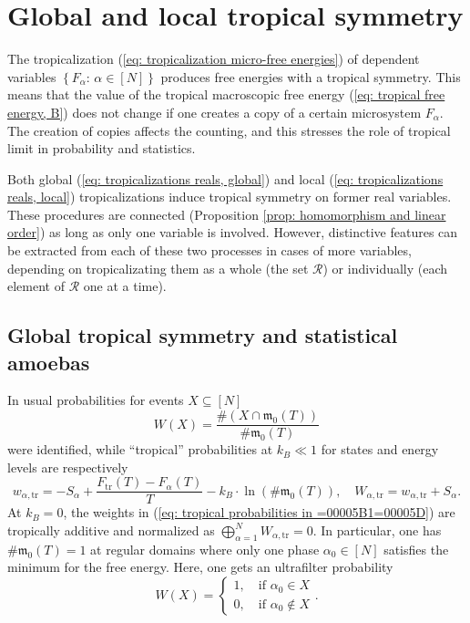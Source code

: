 \documentclass[11pt,british,reqno]{article}
\numberwithin{equation}{section}
\numberwithin{figure}{section}
\numberwithin{table}{section}
\theoremstyle{definition}
\theoremstyle{definition}
\theoremstyle{plain}
\theoremstyle{plain}
\theoremstyle{remark}
\theoremstyle{plain}
\numberwithin{equation}{section}
\numberwithin{figure}{section}
\numberwithin{table}{section}
\theoremstyle{plain}
\begin{document}
\section{\label{sec: Global and local tropical symmetry}
Global and local tropical symmetry}

The tropicalization (\ref{eq: tropicalization micro-free energies})
of dependent variables $\left\{ F_{\alpha}:\,\alpha\in[N]\right\} $
produces free energies with a tropical symmetry. This means that the
value of the tropical macroscopic free energy (\ref{eq: tropical free energy, B})
does not change if one creates a copy of a certain microsystem $F_{\alpha}$.
The creation of copies affects the counting, and this stresses the role of tropical limit in probability and statistics. 

Both global (\ref{eq: tropicalizations reals, global}) and local
(\ref{eq: tropicalizations reals, local}) tropicalizations induce
tropical symmetry on former real variables. These procedures are connected (Proposition \ref{prop: homomorphism and linear order}) as long as only one variable is involved. However, distinctive features can be extracted from each of these two processes in cases of more variables, depending on tropicalizating them as a whole (the set $\mathcal{R}$) or individually (each element of $\mathcal{R}$ one at a time).  

\subsection{\label{subsec: Global tropical symmetry and statistical amoebas}
Global tropical symmetry and statistical amoebas}

In \cite{AK2015} usual probabilities for events $X\subseteq[N]$
\begin{equation}
W(X)=\frac{\#\left(X\cap\mathfrak{m}_{0}(T)\right)}{\#\mathfrak{m}_{0}(T)}\label{eq: usual probability in =00005B1=00005D}
\end{equation}
were identified, while ``tropical'' probabilities at $k_{B}\ll1$
for states and energy levels are respectively 
\begin{equation}
w_{\alpha,\mathrm{tr}}=-S_{\alpha}+\frac{F_{\mathrm{tr}}(T)-F_{\alpha}(T)}{T}-k_{B}\cdot\ln\left(\#\mathfrak{m}_{0}(T)\right),\quad W_{\alpha,\mathrm{tr}}=w_{\alpha,\mathrm{tr}}+S_{\alpha}.\label{eq: tropical probabilities in =00005B1=00005D}
\end{equation}
At $k_{B}=0$, the weights in (\ref{eq: tropical probabilities in =00005B1=00005D})
are tropically additive and normalized as ${\displaystyle \bigoplus_{\alpha=1}^{N}W_{\alpha,\mathrm{tr}}=0}$.
In particular, one has $\#\mathfrak{m}_{0}(T)=1$ at regular domains
where only one phase $\alpha_{0}\in[N]$ satisfies the minimum for the 
free energy. Here, one gets an ultrafilter probability 
\begin{equation}
W(X)=\left\{ \begin{array}{c}
1,\quad\mbox{if }\alpha_{0}\in X\\
0,\quad\mbox{if }\alpha_{0}\notin X
\end{array}\right..\label{eq: regular domain probability}
\end{equation}
\end{document}
